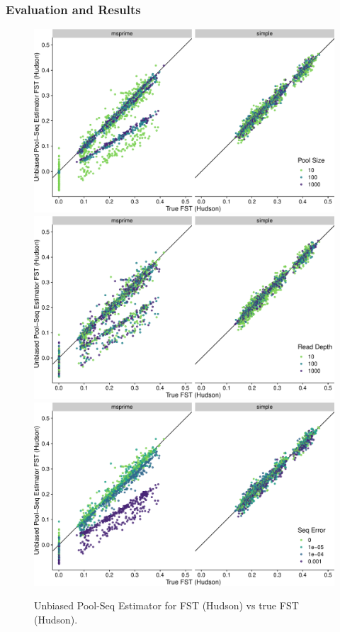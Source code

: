 \documentclass[letterpaper,fontsize=9pt,DIV=12]{scrartcl}
\begin{document}

\subsubsection*{Evaluation and Results}
\label{supp:sec:FST:sub:Comparison:sub:Results}

\begin{figure}[p]
    \centering
    \includegraphics[width=.69\linewidth]{true_hudson_fst-est_spence_hudson-pool_size.pdf}
    \includegraphics[width=.69\linewidth]{true_hudson_fst-est_spence_hudson-read_depth.pdf}
    \includegraphics[width=.69\linewidth]{true_hudson_fst-est_spence_hudson-seq_error.pdf}
    \vspace*{-1em}
    \caption{
        Unbiased Pool-Seq Estimator for FST (Hudson) vs true FST (Hudson).
    }
\label{fig:UnbiasedHudson}
\end{figure}
\end{document}
